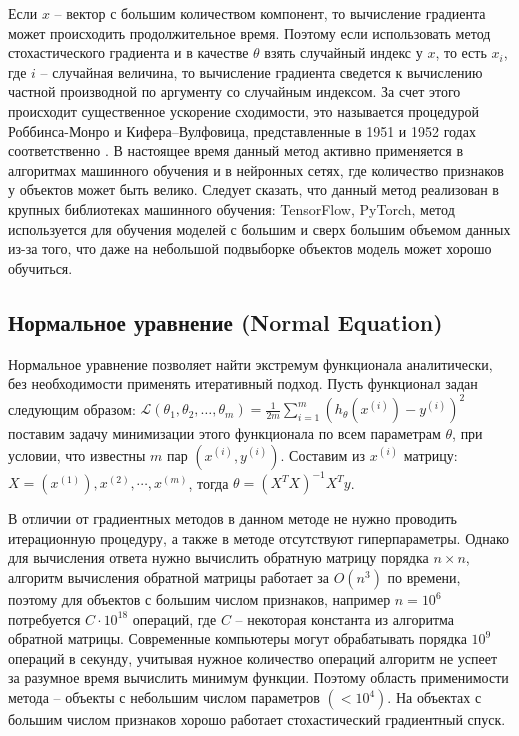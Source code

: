 Если $x$ -- вектор с большим количеством компонент, то вычисление градиента может происходить продолжительное время. Поэтому если использовать метод стохастического градиента и в качестве $\theta$ взять случайный индекс у $x$, то есть $x_i$, где $i$ -- случайная величина, то вычисление градиента сведется к вычислению частной производной по аргументу со случайным индексом. За счет этого происходит существенное ускорение сходимости, это называется процедурой Роббинса-Монро и Кифера–Вулфовица, представленные в 1951 и 1952 годах соответственно \cite{wiki:stochastic_grad}. В настоящее время данный метод активно применяется в алгоритмах машинного обучения и в нейронных сетях, где количество признаков у объектов может быть велико. Следует сказать, что данный метод реализован в крупных библиотеках машинного обучения: TensorFlow, PyTorch, метод используется для обучения моделей с большим и сверх большим объемом данных из-за того, что даже на небольшой подвыборке объектов модель может хорошо обучиться.


\subsection{Нормальное уравнение (Normal Equation)}

Нормальное уравнение позволяет найти экстремум функционала аналитически, без необходимости применять итеративный подход. Пусть функционал задан следующим образом: $\mathcal{L}(\theta_1,\theta_2,\dots,\theta_m) = \frac{1}{2m} \sum\limits_{i=1}^{m}(h_{\theta}(x^{(i)}) - y^{(i)})^2$ поставим задачу минимизации этого функционала по всем параметрам $\theta$, при условии, что известны $m$ пар $(x^{(i)}, y^{(i)})$. Составим из $x^{(i)}$ матрицу: $X = (x^{(1)}), x^{(2)}, \cdots, x^{(m)}$, тогда $\theta = (X^{T} X)^{-1} X^{T} y$.

В отличии от градиентных методов в данном методе не нужно проводить итерационную процедуру, а также в методе отсутствуют гиперпараметры. Однако для вычисления ответа нужно вычислить обратную матрицу порядка $n \times n$, алгоритм вычисления обратной матрицы работает за $O(n^3)$ по времени, поэтому для объектов с большим числом признаков, например $n=10^6$ потребуется $C \cdot 10^{18}$ операций, где $C$ -- некоторая константа из алгоритма обратной матрицы. Современные компьютеры могут обрабатывать порядка $10^9$ операций в секунду, учитывая нужное количество операций алгоритм не успеет за разумное время вычислить минимум функции. Поэтому область применимости метода -- объекты с небольшим числом параметров $(< 10^4)$. На объектах с большим числом признаков хорошо работает стохастический градиентный спуск.


